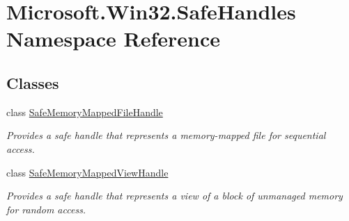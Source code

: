 \hypertarget{namespace_microsoft_1_1_win32_1_1_safe_handles}{}\section{Microsoft.\+Win32.\+Safe\+Handles Namespace Reference}
\label{namespace_microsoft_1_1_win32_1_1_safe_handles}
\subsection*{Classes}
\begin{DoxyCompactItemize}
\item 
class \hyperlink{class_microsoft_1_1_win32_1_1_safe_handles_1_1_safe_memory_mapped_file_handle}{Safe\+Memory\+Mapped\+File\+Handle}
\begin{DoxyCompactList}\small\item\em Provides a safe handle that represents a memory-\/mapped file for sequential access. \end{DoxyCompactList}\item 
class \hyperlink{class_microsoft_1_1_win32_1_1_safe_handles_1_1_safe_memory_mapped_view_handle}{Safe\+Memory\+Mapped\+View\+Handle}
\begin{DoxyCompactList}\small\item\em Provides a safe handle that represents a view of a block of unmanaged memory for random access. \end{DoxyCompactList}\end{DoxyCompactItemize}
